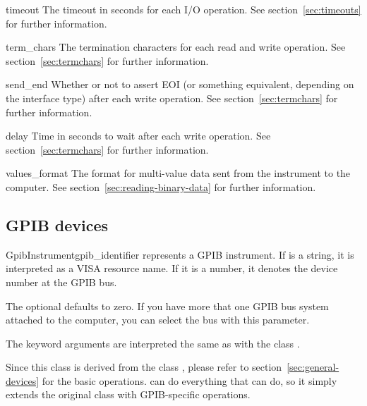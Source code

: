 \documentclass{howto}
\begin{document}
\begin{memberdesc}{timeout}
  The timeout in seconds for each I/O operation.  See
  section~\ref{sec:timeouts} for further information.
\end{memberdesc}

\begin{memberdesc}{term_chars}
  The termination characters for each read and write operation.  See
  section~\ref{sec:termchars} for further information.
\end{memberdesc}

\begin{memberdesc}{send_end}
  Whether or not to assert EOI (or something equivalent, depending on the
  interface type) after each write operation.  See section~\ref{sec:termchars}
  for further information.
\end{memberdesc}

\begin{memberdesc}{delay}
  Time in seconds to wait after each write operation.  See
  section~\ref{sec:termchars} for further information.
\end{memberdesc}

\begin{memberdesc}{values_format}
  The format for multi-value data sent from the instrument to the computer.
  See section~\ref{sec:reading-binary-data} for further information.
\end{memberdesc}


\subsection{GPIB devices}
\label{sec:gpib-devices}

\begin{classdesc}{GpibInstrument}{gpib_identifier}
  represents a GPIB instrument.  If  is a string, it is
  interpreted as a VISA resource name.  If it is a number, it denotes the
  device number at the GPIB bus.

  The optional  defaults to zero.  If you have more that one
  GPIB bus system attached to the computer, you can select the bus with this
  parameter.

  The keyword arguments are interpreted the same as with the class
  .
\end{classdesc}

\begin{notice}
  Since this class is derived from the class , please refer
  to section~\ref{sec:general-devices} for the basic operations.
   can do everything that  can do, so
  it simply extends the original class with GPIB-specific operations.
\end{notice}
\end{document}
